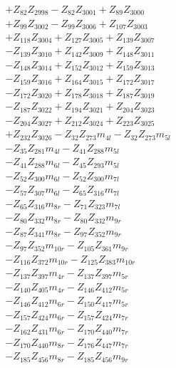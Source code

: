 \begin{multicols}{2}
\begin{align}
&+ Z_{82}Z_{2998} - Z_{82}Z_{3001} + Z_{89}Z_{3000}  \nonumber \\
&+ Z_{99}Z_{3002} - Z_{99}Z_{3006} + Z_{107}Z_{3003}  \nonumber \\
&+ Z_{118}Z_{3004} + Z_{127}Z_{3005} + Z_{139}Z_{3007}  \nonumber \\
&- Z_{139}Z_{3010} + Z_{142}Z_{3009} + Z_{148}Z_{3011}  \nonumber \\
&- Z_{148}Z_{3014} + Z_{152}Z_{3012} + Z_{159}Z_{3013}  \nonumber \\
&- Z_{159}Z_{3016} + Z_{164}Z_{3015} + Z_{172}Z_{3017}  \nonumber \\
&- Z_{172}Z_{3020} + Z_{178}Z_{3018} + Z_{187}Z_{3019}  \nonumber \\
&- Z_{187}Z_{3022} + Z_{194}Z_{3021} + Z_{204}Z_{3023}  \nonumber \\
&- Z_{204}Z_{3027} + Z_{212}Z_{3024} + Z_{223}Z_{3025}  \nonumber \\
&+ Z_{232}Z_{3026} - Z_{32}Z_{273}m_{4l} - Z_{32}Z_{273}m_{5l}  \nonumber \\
&- Z_{35}Z_{281}m_{4l} - Z_{41}Z_{288}m_{5l}  \nonumber \\
&- Z_{41}Z_{288}m_{6l} - Z_{45}Z_{293}m_{5l}  \nonumber \\
&- Z_{52}Z_{300}m_{6l} - Z_{52}Z_{300}m_{7l}  \nonumber \\
&- Z_{57}Z_{307}m_{6l} - Z_{65}Z_{316}m_{7l}  \nonumber \\
&- Z_{65}Z_{316}m_{8r} - Z_{71}Z_{323}m_{7l}  \nonumber \\
&- Z_{80}Z_{332}m_{8r} - Z_{80}Z_{332}m_{9r}  \nonumber \\
&- Z_{87}Z_{341}m_{8r} - Z_{97}Z_{352}m_{9r}  \nonumber \\
&- Z_{97}Z_{352}m_{10r} - Z_{105}Z_{361}m_{9r}  \nonumber \\
&- Z_{116}Z_{372}m_{10r} - Z_{125}Z_{383}m_{10r}  \nonumber \\
&- Z_{137}Z_{397}m_{4r} - Z_{137}Z_{397}m_{5r}  \nonumber \\
&- Z_{140}Z_{405}m_{4r} - Z_{146}Z_{412}m_{5r}  \nonumber \\
&- Z_{146}Z_{412}m_{6r} - Z_{150}Z_{417}m_{5r}  \nonumber \\
&- Z_{157}Z_{424}m_{6r} - Z_{157}Z_{424}m_{7r}  \nonumber \\
&- Z_{162}Z_{431}m_{6r} - Z_{170}Z_{440}m_{7r}  \nonumber \\
&- Z_{170}Z_{440}m_{8r} - Z_{176}Z_{447}m_{7r}  \nonumber \\
&- Z_{185}Z_{456}m_{8r} - Z_{185}Z_{456}m_{9r}  \nonumber \\

\end{align}
\end{multicols}
